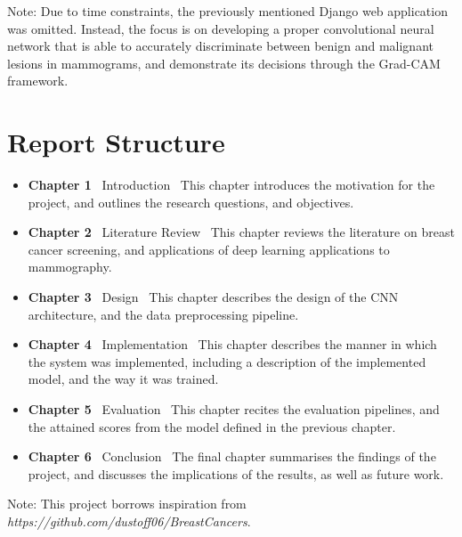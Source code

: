 \documentclass[main]{subfiles}
\begin{document}
\noindent Note: Due to time constraints, the previously mentioned Django web application was omitted. Instead, the focus is on developing a proper convolutional neural network that is able to accurately discriminate between benign and malignant lesions in mammograms, and demonstrate its decisions through the Grad-CAM framework.

\section{Report Structure}
\label{sec:intro_report_structure}
\begin{itemize}
	\item \textbf{Chapter 1} \textemdash\ Introduction \textemdash\ This chapter introduces the motivation for the project, and outlines the research questions, and objectives.
	\item \textbf{Chapter 2} \textemdash\ Literature Review \textemdash\ This chapter reviews the literature on breast cancer screening, and applications of deep learning applications to mammography.
	\item \textbf{Chapter 3} \textemdash\ Design \textemdash\ This chapter describes the design of the CNN architecture, and the data preprocessing pipeline.
	\item \textbf{Chapter 4} \textemdash\ Implementation \textemdash\ This chapter describes the manner in which the system was implemented, including a description of the implemented model, and the way it was trained.
	\item \textbf{Chapter 5} \textemdash\ Evaluation \textemdash\ This chapter recites the evaluation pipelines, and the attained scores from the model defined in the previous chapter.
	\item \textbf{Chapter 6} \textemdash\ Conclusion \textemdash\ The final chapter summarises the findings of the project, and discusses the implications of the results, as well as future work.
\end{itemize}


\noindent Note: This project borrows inspiration from \textit{https://github.com/dustoff06/BreastCancers}.
\end{document}
